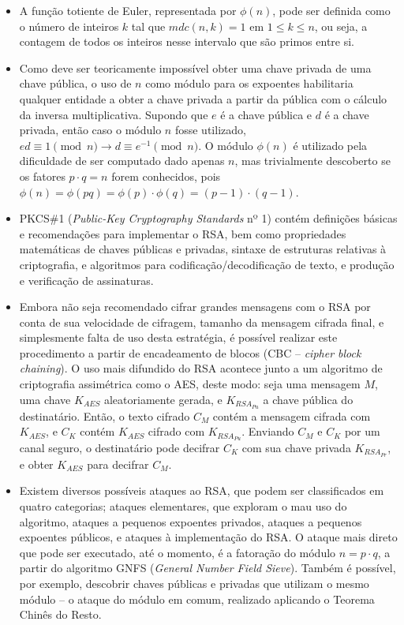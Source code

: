 \documentclass{article}
\begin{document}
\begin{itemize}

\item A função totiente de Euler, representada por $\phi(n)$, pode ser definida
como o número de inteiros $k$ tal que $mdc(n, k) = 1$ em $1 \leq k \leq n$, ou
seja, a contagem de todos os inteiros nesse intervalo que são primos entre si.

\item Como deve ser teoricamente impossível obter uma chave privada de uma
chave pública, o uso de $n$ como módulo para os expoentes habilitaria qualquer
entidade a obter a chave privada a partir da pública com o cálculo da inversa
multiplicativa. Supondo que $e$ é a chave pública e $d$ é a chave privada,
então caso o módulo $n$ fosse utilizado,
$ed \equiv 1 \pmod{n} \longrightarrow d \equiv e^{-1} \pmod{n}$. O módulo
$\phi(n)$ é utilizado pela dificuldade de ser computado dado apenas $n$, mas
trivialmente descoberto se os fatores $p \cdot q = n$ forem conhecidos, pois
$\phi(n) = \phi(pq) = \phi(p) \cdot \phi(q) = (p - 1) \cdot (q - 1)$.

\item PKCS\#1 (\emph{Public-Key Cryptography Standards} nº 1) contém definições
básicas e recomendações para implementar o RSA, bem como propriedades
matemáticas de chaves públicas e privadas, sintaxe de estruturas relativas à
criptografia, e algoritmos para codificação/decodificação de texto, e produção
e verificação de assinaturas.

\item Embora não seja recomendado cifrar grandes mensagens com o RSA por conta
de sua velocidade de cifragem, tamanho da mensagem cifrada final, e
simplesmente falta de uso desta estratégia, é possível realizar este
procedimento a partir de encadeamento de blocos (CBC -- \emph{cipher block
chaining}). O uso mais difundido do RSA acontece junto a um algoritmo de
criptografia assimétrica como o AES, deste modo: seja uma mensagem $M$, uma
chave $K_{AES}$ aleatoriamente gerada, e $K_{RSA_{Pu}}$ a chave pública do
destinatário. Então, o texto cifrado $C_{M}$ contém a mensagem cifrada com
$K_{AES}$, e $C_{K}$ contém $K_{AES}$ cifrado com $K_{RSA_{Pu}}$. Enviando
$C_{M}$ e $C_{K}$ por um canal seguro, o destinatário pode decifrar $C_{K}$
com sua chave privada $K_{RSA_{Pr}}$, e obter $K_{AES}$ para decifrar $C_{M}$.

\item Existem diversos possíveis ataques ao RSA, que podem ser classificados em
quatro categorias; ataques elementares, que exploram o mau uso do algoritmo,
ataques a pequenos expoentes privados, ataques a pequenos expoentes públicos, e
ataques à implementação do RSA. \cite{Boneh99twentyyears} O ataque mais direto
que pode ser executado, até o momento, é a fatoração do módulo $n = p \cdot q$,
a partir do algoritmo GNFS (\emph{General Number Field Sieve}). Também é
possível, por exemplo, descobrir chaves públicas e privadas que utilizam o
mesmo módulo -- o ataque do módulo em comum, realizado aplicando o Teorema
Chinês do Resto.


\end{itemize}
\end{document}
